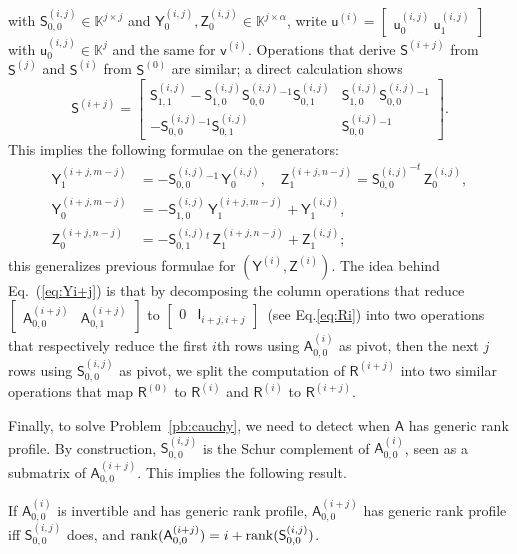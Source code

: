 \documentclass[sigconf]{acmart}
\newcommand{\vu}{\ensuremath{\mathsf{u}}}
\newcommand{\vv}{\ensuremath{\mathsf{v}}}
\newcommand{\mA}{\ensuremath{\mathsf{A}}}
\newcommand{\mI}{\ensuremath{\mathsf{I}}}
\newcommand{\mR}{\ensuremath{\mathsf{R}}}
\newcommand{\mS}{\ensuremath{\mathsf{S}}}
\newcommand{\mY}{\ensuremath{\mathsf{Y}}}
\newcommand{\mZ}{\ensuremath{\mathsf{Z}}}
\newcommand{\K}{\ensuremath{\mathbb{K}}}
\theoremstyle{acmdefinition}
\begin{document}
with $\mS^{(i,j)}_{0,0} \in \K^{j \times j}$ and
$\mY^{(i,j)}_0, \mZ^{(i,j)}_0 \in \K^{j \times \alpha}$, write
$\vu^{(i)} = 
[\begin{smallmatrix} \vu^{(i,j)}_0 \  \vu^{(i,j)}_1 
  \end{smallmatrix} ]$ 
with $\vu^{(i,j)}_0 \in \K^j$ and the same for $\vv^{(i)}$.
Operations that derive $\mS^{(i+j)}$ from
$\mS^{(j)}$ and $\mS^{(i)}$ from $\mS^{(0)}$ are similar; a direct calculation shows
\begin{equation}
\label{eq:Si+j}
\mS^{(i+j)} = 
\begin{bmatrix} 
  \mS^{(i,j)}_{1,1} - \mS^{(i,j)}_{1,0} {\mS^{(i,j)}_{0,0}}{}^{-1} \mS^{(i,j)}_{0,1} 
  & 
  \mS^{(i,j)}_{1,0} {\mS^{(i,j)}_{0,0}}{}^{-1} 
  \\[1mm]
  -{\mS^{(i,j)}_{0,0}}{}^{-1} \mS^{(i,j)}_{0,1}
  &  
  {\mS^{(i,j)}_{0,0}}{}^{-1} 
\end{bmatrix}.
\end{equation}
This implies the following formulae on the generators:
\begin{align}
\mY^{(i+j,m-j)}_1&= -{\mS^{(i,j)}_{0,0}}{}^{-1} \,\mY^{(i,j)}_0,\quad
\mZ^{(i+j,n-j)}_1= {\mS^{(i,j)}_{0,0}}^{-t} \,\mZ^{(i,j)}_0, \nonumber\\
\mY^{(i+j,m-j)}_0&=-\mS^{(i,j)}_{1,0} \,\mY^{(i+j,m-j)}_1 + \mY^{(i,j)}_1,\label{eq:Yi+j}\\
\mZ^{(i+j,n-j)}_0&=-{\mS^{(i,j)}_{0,1}}{}^t \,\mZ^{(i+j,n-j)}_1 + \mZ^{(i,j)}_1 \nonumber;
\end{align}
%
this generalizes previous formulae for $(\mY^{(i)},\mZ^{(i)})$.  The
idea behind Eq.~(\ref{eq:Yi+j}) is that by decomposing the column
operations that reduce
$[\begin{smallmatrix} \mA^{(i+j)}_{0,0} & \mA^{(i+j)}_{0,1} \end{smallmatrix}]$
to $[\begin{smallmatrix} 0 & \mI_{i+j,i+j} \end{smallmatrix}]$~(see Eq.\eqref{eq:Ri}) into two operations that respectively reduce the
first $i$th rows using $\mA^{(i)}_{0,0}$ as pivot, then the next $j$
rows using $\mS^{(i,j)}_{0,0}$ as pivot, we split the computation of
$\mR^{(i+j)}$ into two similar operations that map $\mR^{(0)}$ to
$\mR^{(i)}$ and $\mR^{(i)}$ to $\mR^{(i+j)}$.

Finally, to solve Problem~\ref{pb:cauchy}, we need to detect when $\mA$ has
generic rank profile. By construction, $\mS^{(i,j)}_{0,0}$ is the
Schur complement of ${\mA^{(i)}_{0,0}}$, seen as a submatrix of
$\mA^{(i+j)}_{0,0}$. This implies the following result.
%
\begin{lemma}\label{lemma:update}
 If $\mA^{(i)}_{0,0}$ is invertible and has generic rank
  profile,
  $\mA^{(i+j)}_{0,0}$ has generic rank profile iff
  $\mS^{(i,j)}_{0,0}$ does, and
  ${\rm rank}(\mA^{(i+j)}_{0,0})=i+{\rm rank}(\mS^{(i,j)}_{0,0})$. 
\end{lemma}
%
\end{document}
